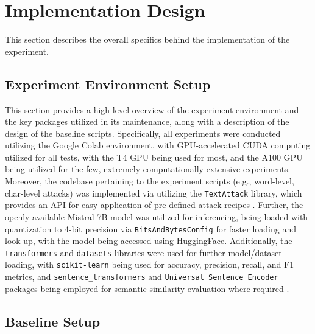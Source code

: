 \documentclass[conference]{IEEEtran}
\begin{document}
\section{Implementation Design}

This section describes the overall specifics behind the implementation of the experiment.

\subsection{Experiment Environment Setup}

This section provides a high-level overview of the experiment environment and the key packages utilized in its maintenance, along with a description of the design of the baseline scripts. Specifically, all experiments were conducted utilizing the Google Colab environment, with GPU-accelerated CUDA computing utilized for all tests, with the T4 GPU being used for most, and the A100 GPU being utilized for the few, extremely computationally extensive experiments. Moreover, the codebase pertaining to the experiment scripts (e.g., word-level, char-level attacks) was implemented via utilizing the \texttt{TextAttack} library, which provides an API for easy application of pre-defined attack recipes \cite{textattack2020framework}. Further, the openly-available Mistral-7B model was utilized for inferencing, being loaded with quantization to 4-bit precision via \texttt{BitsAndBytesConfig} for faster loading and look-up, with the model being accessed using HuggingFace. Additionally, the \texttt{transformers} and \texttt{datasets} libraries were used for further model/dataset loading, with \texttt{scikit-learn} being used for accuracy, precision, recall, and F1 metrics, and \texttt{sentence\_transformers} and \texttt{Universal Sentence Encoder} packages being employed for semantic similarity evaluation where required \cite{cer2018use}.

\subsection{Baseline Setup}
\end{document}
